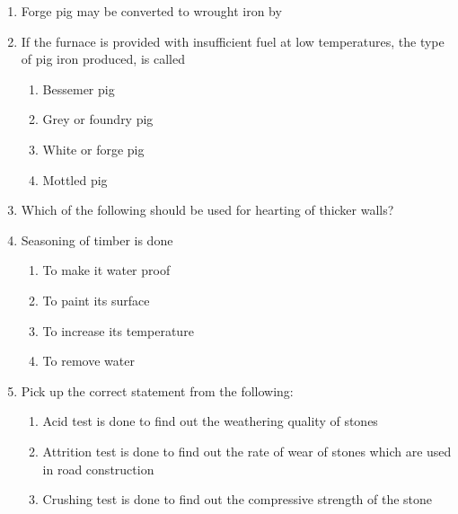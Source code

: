 \documentclass[11pt,a4paper]{article}
\begin{document}
\begin{enumerate}
\begin{enumerate*}[itemjoin=\qquad, label=\Alph*.]
\end{enumerate*}
\item{Forge pig may be converted to wrought iron by}
\\
\item{If the furnace is provided with insufficient fuel at low temperatures, the type of pig iron produced, is called}
\begin{enumerate}[label=\Alph*.]
\item{Bessemer pig}
\item{Grey or foundry pig}
\item{White or forge pig}
\item{Mottled pig}
\end{enumerate}
\item{Which of the following should be used for hearting of thicker walls?}
\\
\item{Seasoning of timber is done}
\begin{enumerate}[label=\Alph*.]
\item{To make it water proof}
\item{To paint its surface}
\item{To increase its temperature}
\item{To remove water}
\end{enumerate}
\item{Pick up the correct statement from the following:}
\begin{enumerate}[label=\Alph*.]
\item{Acid test is done to find out the weathering quality of stones}
\item{Attrition test is done to find out the rate of wear of stones which are used in road construction}
\item{Crushing test is done to find out the compressive strength of the stone}

\end{enumerate}
\end{enumerate}
\end{document}
